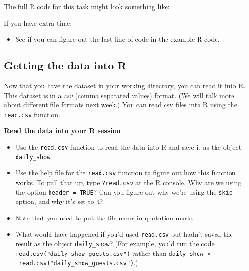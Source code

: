 \documentclass[]{book}
\makeatletter
\newenvironment{Shaded}{\begin{snugshade}}{\end{snugshade}}
\newcommand{\KeywordTok}[1]{\textcolor[rgb]{0.13,0.29,0.53}{\textbf{#1}}}
\newcommand{\StringTok}[1]{\textcolor[rgb]{0.31,0.60,0.02}{#1}}
\newcommand{\CommentTok}[1]{\textcolor[rgb]{0.56,0.35,0.01}{\textit{#1}}}
\newcommand{\OperatorTok}[1]{\textcolor[rgb]{0.81,0.36,0.00}{\textbf{#1}}}
\newcommand{\NormalTok}[1]{#1}
\providecommand{\tightlist}{%
  \setlength{\itemsep}{0pt}\setlength{\parskip}{0pt}}
\newenvironment{kframe}{%
\medskip{}
\setlength{\fboxsep}{.8em}
 \def\at@end@of@kframe{}%
 \ifinner\ifhmode%
  \def\at@end@of@kframe{\end{minipage}}%
  \begin{minipage}{\columnwidth}%
 \fi\fi%
 \def\FrameCommand##1{\hskip\@totalleftmargin \hskip-\fboxsep
 \colorbox{shadecolor}{##1}\hskip-\fboxsep
     \hskip-\linewidth \hskip-\@totalleftmargin \hskip\columnwidth}%
 \MakeFramed {\advance\hsize-\width
   \@totalleftmargin\z@ \linewidth\hsize
   \@setminipage}}%
 {\par\unskip\endMakeFramed%
 \at@end@of@kframe}
\renewenvironment{Shaded}{\begin{kframe}}{\end{kframe}}
\theoremstyle{definition}
\theoremstyle{definition}
\theoremstyle{definition}
\theoremstyle{remark}
\makeatother
\begin{document}
The full R code for this task might look something like:

\begin{Shaded}
\end{Shaded}

If you have extra time:

\begin{itemize}
\tightlist
\item
  See if you can figure out the last line of code in the example R code.
\end{itemize}

\subsection{Getting the data into R}\label{getting-the-data-into-r}

Now that you have the dataset in your working directory, you can read it
into R. This dataset is in a \emph{csv} (comma separated values) format.
(We will talk more about different file formats next week.) You can read
csv files into R using the \texttt{read.csv} function.

\textbf{Read the data into your R session}

\begin{itemize}
\tightlist
\item
  Use the \texttt{read.csv} function to read the data into R and save it
  as the object \texttt{daily\_show}.
\item
  Use the help file for the \texttt{read.csv} function to figure out how
  this function works. To pull that up, type \texttt{?read.csv} at the R
  console. Why are we using the option \texttt{header\ =\ TRUE}? Can you
  figure out why we're using the \texttt{skip} option, and why it's set
  to 4?
\item
  Note that you need to put the file name in quotation marks.
\item
  What would have happened if you'd used \texttt{read.csv} but hadn't
  saved the result as the object \texttt{daily\_show}? (For example,
  you'd run the code \texttt{read.csv("daily\_show\_guests.csv")} rather
  than
  \texttt{daily\_show\ \textless{}-\ read.csv("daily\_show\_guests.csv")}.)
\end{itemize}
\end{document}
